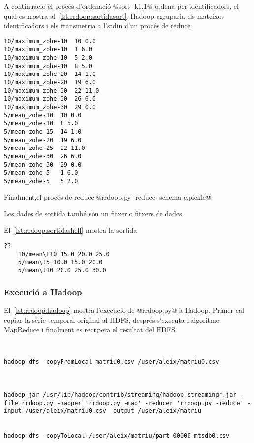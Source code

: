 A continuació el procés d'ordenació @sort -k1,1@ ordena per
identificadors, el qual es mostra
al~\autoref{lst:rrdoop:sortidasort}. Hadoop agruparia els mateixos
identificadors i els transmetria a l'stdin d'un procés de reduce.

\begin{lstlisting}[style=stdout,caption=Sortida del procés d'ordenació,label=lst:rrdoop:sortidasort]
10/maximum_zohe-10	10 0.0
10/maximum_zohe-10	1 6.0
10/maximum_zohe-10	5 2.0
10/maximum_zohe-10	8 5.0
10/maximum_zohe-20	14 1.0
10/maximum_zohe-20	19 6.0
10/maximum_zohe-30	22 11.0
10/maximum_zohe-30	26 6.0
10/maximum_zohe-30	29 0.0
5/mean_zohe-10	10 0.0
5/mean_zohe-10	8 5.0
5/mean_zohe-15	14 1.0
5/mean_zohe-20	19 6.0
5/mean_zohe-25	22 11.0
5/mean_zohe-30	26 6.0
5/mean_zohe-30	29 0.0
5/mean_zohe-5	1 6.0
5/mean_zohe-5	5 2.0
\end{lstlisting}


Finalment,el procés de reduce %
@rrdoop.py -reduce -schema e.pickle@

Les dades de sortida també són un fitxer o fitxers de dades\todo{}



El~\autoref{lst:rrdoop:sortidashell} mostra la sortida\todo{}

\begin{lstlisting}[style=stdout,caption=Sortida de rrdoop.py -reduce,label=lst:rrdoop:sortidashell]
??
    10/mean\t10 15.0 20.0 25.0
    5/mean\t5 10.0 15.0 20.0
    5/mean\t10 20.0 25.0 30.0

\end{lstlisting}





\subsubsection{Execució a Hadoop}


El~\autoref{lst:rrdoop:hadoop} mostra l'execució de @rrdoop.py@ a
Hadoop. Primer cal copiar la sèrie temporal original al \gls{HDFS},
després s'executa l'algoritme MapReduce i finalment es recupera el
resultat del \gls{HDFS}.\todo{}



\begin{lstlisting}[style=sh,caption=Execució a Hadoop de
  rrdoop.py,label=lst:rrdoop:hadoop]


hadoop dfs -copyFromLocal matriu0.csv /user/aleix/matriu0.csv



hadoop jar /usr/lib/hadoop/contrib/streaming/hadoop-streaming*.jar -file rrdoop.py -mapper 'rrdoop.py -map' -reducer 'rrdoop.py -reduce' -input /user/aleix/matriu0.csv -output /user/aleix/matriu


hadoop dfs -copyToLocal /user/aleix/matriu/part-00000 mtsdb0.csv

\end{lstlisting}


